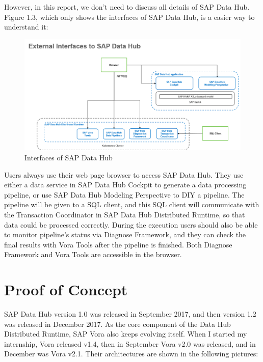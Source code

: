 \documentclass[article,colorback,accentcolor=tud4c]{tudreport}
\begin{document}
However, in this report, we don't need to discuss all details of SAP Data Hub. Figure 1.3, which only shows the interfaces of SAP Data Hub, is a easier way to understand it:

\begin{figure}[!h]
	\centering
	\includegraphics[width=\textwidth]{interfaces}
	\caption{Interfaces of SAP Data Hub\cite{data hub architecture}}
\end{figure}

Users always use their web page browser to access SAP Data Hub. They use either a data service in SAP Data Hub Cockpit to generate a data processing pipeline, or use SAP Data Hub Modeling Perspective to DIY a pipeline. The pipeline will be given to a SQL client, and this SQL client will communicate with the Transaction Coordinator in SAP Data Hub Distributed Runtime, so that data could be processed correctly. During the execution users should also be able to monitor pipeline's status via Diagnose Framework, and they can check the final results with Vora Tools after the pipeline is finished. Both Diagnose Framework and Vora Tools are accessible in the browser.

\newpage

\section{Proof of Concept}
\setcounter{table}{0}
\setcounter{figure}{0}

SAP Data Hub version 1.0 was released in September 2017, and then version 1.2 was released in December 2017. As the core component of the Data Hub Distributed Runtime, SAP Vora also keeps evolving itself. When I started my internship, Vora released v1.4, then in September Vora v2.0 was released, and in December was Vora v2.1. Their architectures are shown in the following pictures:
\end{document}
